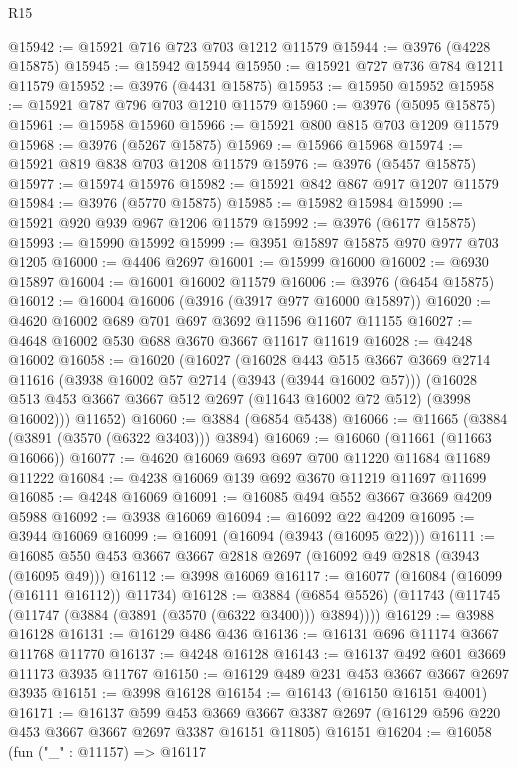 \begin{lexlean}{R15}
\begin{coremodule}
@15942 := @15921 @716 @723 @703 @1212 @11579
@15944 := @3976 (@4228 @15875)
@15945 := @15942 @15944
@15950 := @15921 @727 @736 @784 @1211 @11579
@15952 := @3976 (@4431 @15875)
@15953 := @15950 @15952
@15958 := @15921 @787 @796 @703 @1210 @11579
@15960 := @3976 (@5095 @15875)
@15961 := @15958 @15960
@15966 := @15921 @800 @815 @703 @1209 @11579
@15968 := @3976 (@5267 @15875)
@15969 := @15966 @15968
@15974 := @15921 @819 @838 @703 @1208 @11579
@15976 := @3976 (@5457 @15875)
@15977 := @15974 @15976
@15982 := @15921 @842 @867 @917 @1207 @11579
@15984 := @3976 (@5770 @15875)
@15985 := @15982 @15984
@15990 := @15921 @920 @939 @967 @1206 @11579
@15992 := @3976 (@6177 @15875)
@15993 := @15990 @15992
@15999 := @3951 @15897 @15875 @970 @977 @703 @1205
@16000 := @4406 @2697
@16001 := @15999 @16000
@16002 := @6930 @15897
@16004 := @16001 @16002 @11579
@16006 := @3976 (@6454 @15875)
@16012 := @16004 @16006 (@3916 (@3917 @977 @16000 @15897))
@16020 := @4620 @16002 @689 @701 @697 @3692 @11596 @11607 @11155
@16027 := @4648 @16002 @530 @688 @3670 @3667 @11617 @11619
@16028 := @4248 @16002
@16058 := @16020
    (@16027
      (@16028
        @443
        @515
        @3667
        @3669
        @2714
        @11616
        (@3938 @16002 @57 @2714 (@3943 (@3944 @16002 @57)))
        (@16028 @513 @453 @3667 @3667 @512 @2697 (@11643 @16002 @72 @512) (@3998 @16002)))
      @11652)
@16060 := @3884 (@6854 @5438)
@16066 := @11665 (@3884 (@3891 (@3570 (@6322 @3403))) @3894)
@16069 := @16060 (@11661 (@11663 @16066))
@16077 := @4620 @16069 @693 @697 @700 @11220 @11684 @11689 @11222
@16084 := @4238 @16069 @139 @692 @3670 @11219 @11697 @11699
@16085 := @4248 @16069
@16091 := @16085 @494 @552 @3667 @3669 @4209 @5988
@16092 := @3938 @16069
@16094 := @16092 @22 @4209
@16095 := @3944 @16069
@16099 := @16091 (@16094 (@3943 (@16095 @22)))
@16111 := @16085 @550 @453 @3667 @3667 @2818 @2697 (@16092 @49 @2818 (@3943 (@16095 @49)))
@16112 := @3998 @16069
@16117 := @16077 (@16084 (@16099 (@16111 @16112)) @11734)
@16128 := @3884 (@6854 @5526) (@11743 (@11745 (@11747 (@3884 (@3891 (@3570 (@6322 @3400))) @3894))))
@16129 := @3988 @16128
@16131 := @16129 @486 @436
@16136 := @16131 @696 @11174 @3667 @11768 @11770
@16137 := @4248 @16128
@16143 := @16137 @492 @601 @3669 @11173 @3935 @11767
@16150 := @16129 @489 @231 @453 @3667 @3667 @2697 @3935
@16151 := @3998 @16128
@16154 := @16143 (@16150 @16151 @4001)
@16171 := @16137
    @599
    @453
    @3669
    @3667
    @3387
    @2697
    (@16129 @596 @220 @453 @3667 @3667 @2697 @3387 @16151 @11805)
    @16151
@16204 := @16058
    (fun ("_" : @11157) =>
    @16117

\end{coremodule}
\end{lexlean}

